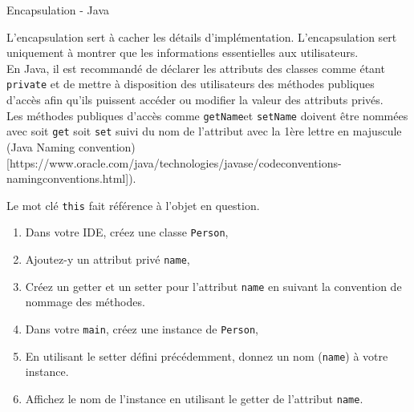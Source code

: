 \begin{Exercice}[10 minutes]{Encapsulation - Java}

L'encapsulation sert à cacher les détails d'implémentation. L'encapsulation sert uniquement à montrer que les informations essentielles aux utilisateurs.\\

En Java, il est recommandé de déclarer les attributs des classes comme étant \lstinline{private} et de mettre à disposition des utilisateurs des méthodes publiques d'accès afin qu'ils puissent accéder ou modifier la valeur des attributs privés.\\

Les méthodes publiques d'accès comme \lstinline{getName}et \lstinline{setName} doivent être nommées avec soit \lstinline{get} soit \lstinline{set} suivi du nom de l'attribut avec la 1ère lettre en majuscule (Java Naming convention)[https://www.oracle.com/java/technologies/javase/codeconventions-namingconventions.html]). 

Le mot clé \lstinline{this} fait référence à l'objet en question.\\

\begin{enumerate}
	\item Dans votre IDE, créez une classe \lstinline{Person},
	\item Ajoutez-y un attribut privé \lstinline{name},
	\item Créez un getter et un setter pour l'attribut \lstinline{name} en suivant la convention de nommage des méthodes.
	\item Dans votre \lstinline{main}, créez une instance de \lstinline{Person}, 
	\item En utilisant le setter défini précédemment, donnez un nom (\lstinline{name}) à votre instance.
	\item Affichez le nom de l'instance en utilisant le getter de l'attribut \lstinline{name}.
\end{enumerate}
	\begin{solution}  
		 
	\end{solution}
\end{Exercice}
	
